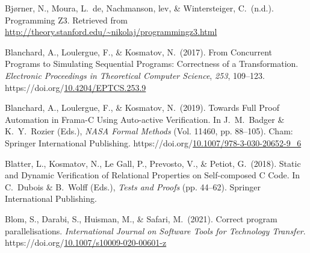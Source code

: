 \documentclass[12pt,twoside]{article}
\begin{document}
{\begin{thebibliography}{1079}
\mdbibitemlabel{}Bjørner, N., Moura, L.~de, Nachmanson,  lev, \& Wintersteiger, C.~(n.d.). Programming Z3. Retrieved from \href{http://theory.stanford.edu/~nikolaj/programmingz3.html}{{\ttfamily http://\hspace{0pt}theory.\hspace{0pt}stanford.\hspace{0pt}edu/\hspace{0pt}\textasciitilde{}nikolaj/\hspace{0pt}programmingz3.\hspace{0pt}html}}%

\mdbibitemlabel{}Blanchard, A., Loulergue, F., \& Kosmatov, N.~(2017). From Concurrent Programs to Simulating Sequential Programs: Correctness of a Transformation. \emph{Electronic Proceedings in Theoretical Computer Science}, \emph{253}, 109–123. https://doi.org/\href{https://dx.doi.org/10.4204/EPTCS.253.9}{10.4204/EPTCS.253.9}%

\mdbibitemlabel{}Blanchard, A., Loulergue, F., \& Kosmatov, N.~(2019). Towards Full Proof Automation in Frama-C Using Auto-active Verification. In J.~M.~Badger \& K.~Y.~Rozier (Eds.), \emph{NASA Formal Methods} (Vol. 11460, pp. 88–105). Cham: Springer International Publishing. https://doi.org/\href{https://dx.doi.org/10.1007/978-3-030-20652-9_6}{10.1007/978-3-030-20652-9\_6}%

\mdbibitemlabel{}Blatter, L., Kosmatov, N., Le Gall, P., Prevosto, V., \& Petiot, G.~(2018). Static and Dynamic Verification of Relational Properties on Self-composed C Code. In C.~Dubois \& B.~Wolff (Eds.), \emph{Tests and Proofs} (pp. 44–62). Springer International Publishing.%

\mdbibitemlabel{}Blom, S., Darabi, S., Huisman, M., \& Safari, M.~(2021). Correct program parallelisations. \emph{International Journal on Software Tools for Technology Transfer}. https://doi.org/\href{https://dx.doi.org/10.1007/s10009-020-00601-z}{10.1007/s10009-020-00601-z}%


\end{thebibliography}}
\end{document}
